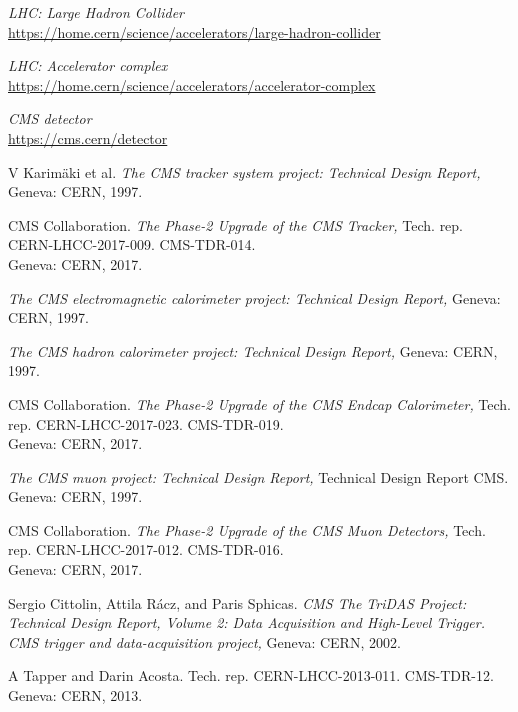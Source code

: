 

\begin{thebibliography}{99}


\textit{LHC: Large Hadron Collider}
\\\url{https://home.cern/science/accelerators/large-hadron-collider}

\textit{LHC: Accelerator complex}
\\\url{https://home.cern/science/accelerators/accelerator-complex}

\textit{CMS detector}
\\\url{https://cms.cern/detector}

V Karimäki et al.
\textit{The CMS tracker system project: Technical Design Report,}
Geneva: CERN, 1997.

CMS Collaboration.
\textit{The Phase-2 Upgrade of the CMS Tracker,}
Tech. rep. CERN-LHCC-2017-009. CMS-TDR-014. \\
Geneva: CERN, 2017. 

\textit{The CMS electromagnetic calorimeter project: Technical Design Report,}
Geneva: CERN, 1997.

\textit{The CMS hadron calorimeter project: Technical Design Report,}
Geneva: CERN, 1997.

CMS Collaboration.
\textit{The Phase-2 Upgrade of the CMS Endcap Calorimeter,}
Tech. rep. CERN-LHCC-2017-023. CMS-TDR-019. \\
Geneva: CERN, 2017. 

\textit{The CMS muon project: Technical Design Report,}
Technical Design Report CMS. \\
Geneva: CERN, 1997.

CMS Collaboration.
\textit{The Phase-2 Upgrade of the CMS Muon Detectors,}
Tech. rep. CERN-LHCC-2017-012. CMS-TDR-016. \\
Geneva: CERN, 2017. 

Sergio Cittolin, Attila Rácz, and Paris Sphicas.
\textit{CMS The TriDAS Project: Technical Design Report, Volume 2: Data Acquisition and
High-Level Trigger. CMS trigger and data-acquisition project,}
Geneva: CERN, 2002.

A Tapper and Darin Acosta.
Tech. rep. CERN-LHCC-2013-011. CMS-TDR-12. \\
Geneva: CERN, 2013.


\end{thebibliography}
